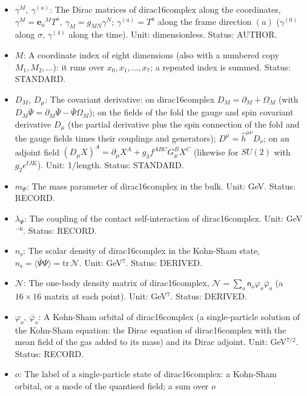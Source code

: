 \documentclass[
  10pt,
]{article}
\providecommand{\tightlist}{%
  \setlength{\itemsep}{0pt}\setlength{\parskip}{0pt}}
\begin{document}
\begin{itemize}
\tightlist
\item
  \(\gamma^M,\ \gamma^{(a)}\): The Dirac matrices of dirac16complex
  along the coordinates, \(\gamma^M = \mathbf{e}_a{}^MT^a\),
  \(\gamma_M = g_{MN}\gamma^N\); \(\gamma^{(a)} = T^a\) along the frame
  direction \((a)\) (\(\gamma^{(0)}\) along \(\sigma\), \(\gamma^{(4)}\)
  along the time). Unit: dimensionless. Status: AUTHOR.
\item
  \(M\): A coordinate index of eight dimensions (also with a numbered
  copy \(M_1, M_2, \dots\)): it runs over \(x_0, x_1, \dots, x_7\); a
  repeated index is summed. Status: STANDARD.
\item
  \(D_M,\ D_\mu\): The covariant derivative: on dirac16complex
  \(D_M = \partial_M + \Omega_M\) (with
  \(D_M\bar\Psi = \partial_M\bar\Psi - \bar\Psi\Omega_M\)); on the
  fields of the fold the gauge and spin covariant derivative \(D_\mu\)
  (the partial derivative plus the spin connection of the fold and the
  gauge fields times their couplings and generators);
  \(D^\mu = \hat h^{\mu\nu}D_\nu\); on an adjoint field
  \((D_\mu X)^A = \partial_\mu X^A + g_3f^{ABC}G^B_\mu X^C\) (likewise
  for \(SU(2)\) with \(g_2\epsilon^{IJK}\)). Unit: 1/length. Status:
  STANDARD.
\item
  \(m_\Psi\): The mass parameter of dirac16complex in the bulk. Unit:
  GeV. Status: RECORD.
\item
  \(\lambda_\Psi\): The coupling of the contact self-interaction of
  dirac16complex. Unit: GeV\(^{-6}\). Status: RECORD.
\item
  \(n_{\mathrm{s}}\): The scalar density of dirac16complex in the
  Kohn-Sham state,
  \(n_{\mathrm{s}} = \langle\bar\Psi\Psi\rangle = \mathrm{tr}\,\mathcal{N}\).
  Unit: GeV\(^7\). Status: DERIVED.
\item
  \(\mathcal{N}\): The one-body density matrix of dirac16complex,
  \(\mathcal{N} = \sum_o\mathsf{n}_o\varphi_o\bar\varphi_o\) (a
  \(16 \times 16\) matrix at each point). Unit: GeV\(^7\). Status:
  DERIVED.
\item
  \(\varphi_o,\ \bar\varphi_o\): A Kohn-Sham orbital of dirac16complex
  (a single-particle solution of the Kohn-Sham equation: the Dirac
  equation of dirac16complex with the mean field of the gas added to its
  mass) and its Dirac adjoint. Unit: GeV\(^{7/2}\). Status: RECORD.
\item
  \(o\): The label of a single-particle state of dirac16complex: a
  Kohn-Sham orbital, or a mode of the quantised field; a sum over \(o\)

\end{itemize}
\end{document}
